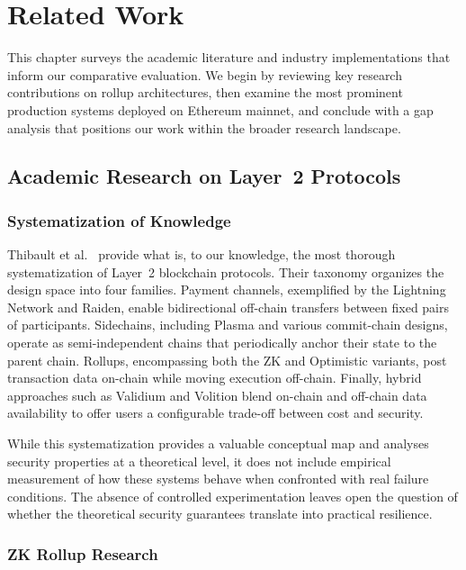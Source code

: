 \chapter{Related Work}
\label{ch:relatedwork}

This chapter surveys the academic literature and industry implementations that inform our comparative evaluation. We begin by reviewing key research contributions on rollup architectures, then examine the most prominent production systems deployed on Ethereum mainnet, and conclude with a gap analysis that positions our work within the broader research landscape.

\section{Academic Research on Layer~2 Protocols}

\subsection{Systematization of Knowledge}

Thibault et al.~\cite{sok-layer2} provide what is, to our knowledge, the most thorough systematization of Layer~2 blockchain protocols. Their taxonomy organizes the design space into four families. Payment channels, exemplified by the Lightning Network and Raiden, enable bidirectional off-chain transfers between fixed pairs of participants. Sidechains, including Plasma and various commit-chain designs, operate as semi-independent chains that periodically anchor their state to the parent chain. Rollups, encompassing both the ZK and Optimistic variants, post transaction data on-chain while moving execution off-chain. Finally, hybrid approaches such as Validium and Volition blend on-chain and off-chain data availability to offer users a configurable trade-off between cost and security.

While this systematization provides a valuable conceptual map and analyses security properties at a theoretical level, it does not include empirical measurement of how these systems behave when confronted with real failure conditions. The absence of controlled experimentation leaves open the question of whether the theoretical security guarantees translate into practical resilience.

\subsection{ZK Rollup Research}

